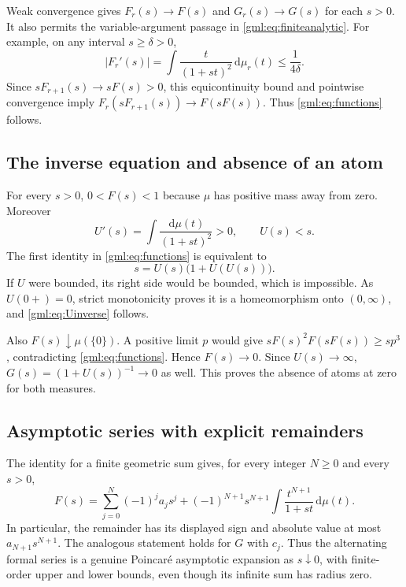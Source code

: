 \documentclass[11pt]{article}
\numberwithin{equation}{section}
\theoremstyle{definition}
\theoremstyle{remark}
\newcommand{\dd}{\,\mathrm d}
\begin{document}
Weak convergence gives $F_r(s)\to F(s)$ and $G_r(s)\to G(s)$ for each
$s>0$. It also permits the variable-argument passage in
\eqref{gml:eq:finiteanalytic}. For example, on any interval $s\ge\delta>0$,
\[
 |F_r'(s)|=\int\frac{t}{(1+st)^2}\dd\mu_r(t)\le\frac1{4\delta}.
\]
Since $sF_{r+1}(s)\to sF(s)>0$, this equicontinuity bound and pointwise
convergence imply
$F_r(sF_{r+1}(s))\to F(sF(s))$. Thus \eqref{gml:eq:functions} follows.

\subsection{The inverse equation and absence of an atom}
For every $s>0$, $0<F(s)<1$ because $\mu$ has positive mass away from zero.
Moreover
\begin{equation}\label{gml:eq:Uderivative}
 U'(s)=\int\frac{\dd\mu(t)}{(1+st)^2}>0,
 \qquad U(s)<s.
\end{equation}
The first identity in \eqref{gml:eq:functions} is equivalent to
\begin{equation}\label{gml:eq:Ucomposition}
 s=U(s)\bigl(1+U(U(s))\bigr).
\end{equation}
If $U$ were bounded, its right side would be bounded, which is impossible.
As $U(0+)=0$, strict monotonicity proves it is a homeomorphism onto
$(0,\infty)$, and \eqref{gml:eq:Uinverse} follows.

Also $F(s)\downarrow\mu(\{0\})$. A positive limit $p$ would give
$sF(s)^2F(sF(s))\ge sp^3$, contradicting \eqref{gml:eq:functions}.
Hence $F(s)\to0$. Since $U(s)\to\infty$, $G(s)=(1+U(s))^{-1}\to0$
as well. This proves the absence of atoms at zero for both measures.

\subsection{Asymptotic series with explicit remainders}
The identity for a finite geometric sum gives, for every integer $N\ge0$
and every $s>0$,
\begin{equation}\label{gml:eq:remainder}
 F(s)=\sum_{j=0}^N(-1)^ja_js^j
 +(-1)^{N+1}s^{N+1}\int\frac{t^{N+1}}{1+st}\dd\mu(t).
\end{equation}
In particular, the remainder has its displayed sign and absolute value
at most $a_{N+1}s^{N+1}$. The analogous statement holds for $G$ with $c_j$.
Thus the alternating formal series is a genuine Poincar\'e asymptotic
expansion as $s\downarrow0$, with finite-order upper and lower bounds,
even though its infinite sum has radius zero.
\end{document}
